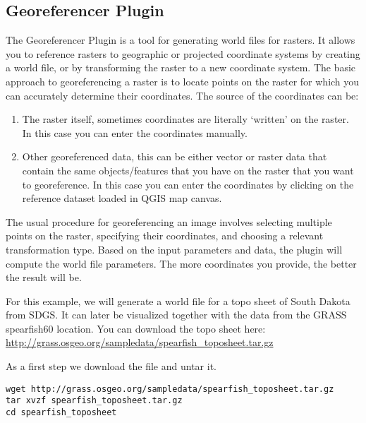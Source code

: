 
\subsection{Georeferencer Plugin}


The Georeferencer Plugin is a tool for generating world files for rasters.
It allows you to reference rasters to geographic or projected coordinate systems by creating a 
world file, or by transforming the raster to a new coordinate system. The basic approach to georeferencing a raster is to locate points on the raster for which you can accurately determine their coordinates. The source of the coordinates can be:

\begin{enumerate}
\item The raster itself, sometimes coordinates are literally `written' on the raster. 
In this case you can enter the coordinates manually.
\item Other georeferenced data, this can be either vector or raster data that contain the same objects/features that you have on the raster that you want to georeference. In this case you can enter the coordinates by clicking on the reference dataset loaded in QGIS map canvas.
\end{enumerate}

The usual procedure for georeferencing an image involves selecting multiple points on the raster, 
specifying their coordinates, and choosing a relevant transformation type. Based on the input parameters and data, the plugin will compute the world file parameters. The more coordinates you provide, the better the result will be.

For this example, we will generate a world file for a topo sheet of South Dakota from SDGS.
It can later be visualized together with the data from the GRASS spearfish60 location.
You can download the topo sheet here: \url{http://grass.osgeo.org/sampledata/spearfish\_toposheet.tar.gz}

As a first step we download the file and untar it.

\begin{verbatim}
wget http://grass.osgeo.org/sampledata/spearfish_toposheet.tar.gz
tar xvzf spearfish_toposheet.tar.gz
cd spearfish_toposheet
\end{verbatim}

